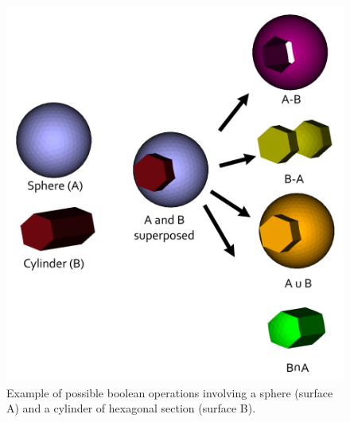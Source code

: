 \begin{figure}
  \centering
  \includegraphics[scale=0.21]{images/09/boolean_operations/boolean_example.png} 
	\caption{Example of possible boolean operations involving a sphere (surface A) and a cylinder of hexagonal section (surface B). }
 \label{boolean_example}
\end{figure}




